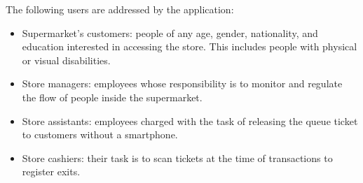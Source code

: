 \documentclass[../../main.tex]{subfiles}
\begin{document}
	The following users are addressed by the application:
	\begin{itemize}
		\item Supermarket's customers: people of any age, gender, nationality, and education interested in accessing the store. This includes people with physical or visual disabilities.
		\item Store managers: employees whose responsibility is to monitor and regulate the flow of people inside the supermarket.
		\item Store assistants: employees charged with the task of releasing the queue ticket to customers without a smartphone.
		\item Store cashiers: their task is to scan tickets at the time of transactions to register exits.
	\end{itemize}
\end{document}
